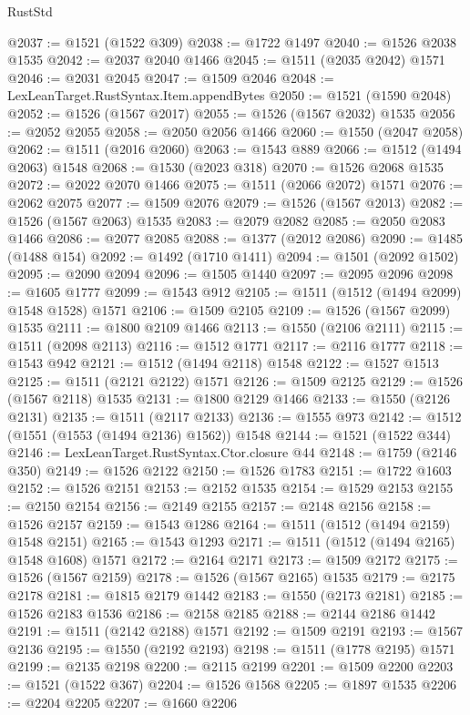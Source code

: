\begin{lexlean}{RustStd}
\begin{coremodule}
{{@2037 := @1521 (@1522 @309)
@2038 := @1722 @1497
@2040 := @1526 @2038 @1535
@2042 := @2037 @2040 @1466
@2045 := @1511 (@2035 @2042) @1571
@2046 := @2031 @2045
@2047 := @1509 @2046
@2048 := LexLeanTarget.RustSyntax.Item.appendBytes
@2050 := @1521 (@1590 @2048)
@2052 := @1526 (@1567 @2017)
@2055 := @1526 (@1567 @2032) @1535
@2056 := @2052 @2055
@2058 := @2050 @2056 @1466
@2060 := @1550 (@2047 @2058)
@2062 := @1511 (@2016 @2060)
@2063 := @1543 @889
@2066 := @1512 (@1494 @2063) @1548
@2068 := @1530 (@2023 @318)
@2070 := @1526 @2068 @1535
@2072 := @2022 @2070 @1466
@2075 := @1511 (@2066 @2072) @1571
@2076 := @2062 @2075
@2077 := @1509 @2076
@2079 := @1526 (@1567 @2013)
@2082 := @1526 (@1567 @2063) @1535
@2083 := @2079 @2082
@2085 := @2050 @2083 @1466
@2086 := @2077 @2085
@2088 := @1377 (@2012 @2086)
@2090 := @1485 (@1488 @154)
@2092 := @1492 (@1710 @1411)
@2094 := @1501 (@2092 @1502)
@2095 := @2090 @2094
@2096 := @1505 @1440
@2097 := @2095 @2096
@2098 := @1605 @1777
@2099 := @1543 @912
@2105 := @1511 (@1512 (@1494 @2099) @1548 @1528) @1571
@2106 := @1509 @2105
@2109 := @1526 (@1567 @2099) @1535
@2111 := @1800 @2109 @1466
@2113 := @1550 (@2106 @2111)
@2115 := @1511 (@2098 @2113)
@2116 := @1512 @1771
@2117 := @2116 @1777
@2118 := @1543 @942
@2121 := @1512 (@1494 @2118) @1548
@2122 := @1527 @1513
@2125 := @1511 (@2121 @2122) @1571
@2126 := @1509 @2125
@2129 := @1526 (@1567 @2118) @1535
@2131 := @1800 @2129 @1466
@2133 := @1550 (@2126 @2131)
@2135 := @1511 (@2117 @2133)
@2136 := @1555 @973
@2142 := @1512 (@1551 (@1553 (@1494 @2136) @1562)) @1548
@2144 := @1521 (@1522 @344)
@2146 := LexLeanTarget.RustSyntax.Ctor.closure @44
@2148 := @1759 (@2146 @350)
@2149 := @1526 @2122
@2150 := @1526 @1783
@2151 := @1722 @1603
@2152 := @1526 @2151
@2153 := @2152 @1535
@2154 := @1529 @2153
@2155 := @2150 @2154
@2156 := @2149 @2155
@2157 := @2148 @2156
@2158 := @1526 @2157
@2159 := @1543 @1286
@2164 := @1511 (@1512 (@1494 @2159) @1548 @2151)
@2165 := @1543 @1293
@2171 := @1511 (@1512 (@1494 @2165) @1548 @1608) @1571
@2172 := @2164 @2171
@2173 := @1509 @2172
@2175 := @1526 (@1567 @2159)
@2178 := @1526 (@1567 @2165) @1535
@2179 := @2175 @2178
@2181 := @1815 @2179 @1442
@2183 := @1550 (@2173 @2181)
@2185 := @1526 @2183 @1536
@2186 := @2158 @2185
@2188 := @2144 @2186 @1442
@2191 := @1511 (@2142 @2188) @1571
@2192 := @1509 @2191
@2193 := @1567 @2136
@2195 := @1550 (@2192 @2193)
@2198 := @1511 (@1778 @2195) @1571
@2199 := @2135 @2198
@2200 := @2115 @2199
@2201 := @1509 @2200
@2203 := @1521 (@1522 @367)
@2204 := @1526 @1568
@2205 := @1897 @1535
@2206 := @2204 @2205
@2207 := @1660 @2206
}}
\end{coremodule}
\end{lexlean}
